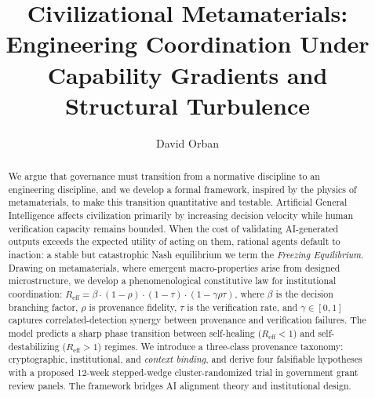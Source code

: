 \documentclass[runningheads]{llncs}
\begin{document}
\title{Civilizational Metamaterials: Engineering Coordination Under Capability Gradients and Structural Turbulence}

\author{David Orban}



\maketitle

\begin{abstract}
We argue that governance must transition from a normative discipline to an engineering discipline, and we develop a formal framework, inspired by the physics of metamaterials, to make this transition quantitative and testable. Artificial General Intelligence affects civilization primarily by increasing decision velocity while human verification capacity remains bounded. When the cost of validating AI-generated outputs exceeds the expected utility of acting on them, rational agents default to inaction: a stable but catastrophic Nash equilibrium we term the \emph{Freezing Equilibrium}. Drawing on metamaterials, where emergent macro-properties arise from designed microstructure, we develop a phenomenological constitutive law for institutional coordination: $R_{\mathrm{eff}} = \beta \cdot (1-\rho) \cdot (1-\tau) \cdot (1-\gamma \rho \tau)$, where $\beta$ is the decision branching factor, $\rho$ is provenance fidelity, $\tau$ is the verification rate, and $\gamma \in [0,1]$ captures correlated-detection synergy between provenance and verification failures. The model predicts a sharp phase transition between self-healing ($R_{\mathrm{eff}} < 1$) and self-destabilizing ($R_{\mathrm{eff}} > 1$) regimes. We introduce a three-class provenance taxonomy: cryptographic, institutional, and \emph{context binding}, and derive four falsifiable hypotheses with a proposed 12-week stepped-wedge cluster-randomized trial in government grant review panels. The framework bridges AI alignment theory and institutional design.

\end{abstract}


\end{document}
